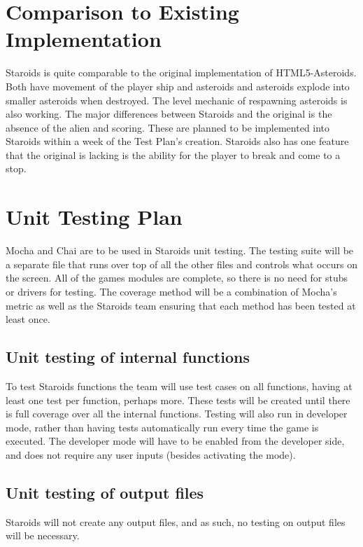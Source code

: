 \documentclass[12pt, titlepage]{article}
\begin{document}
\section{Comparison to Existing Implementation}
Staroids is quite comparable to the original implementation of HTML5-Asteroids. Both have movement of the player ship and asteroids and asteroids explode into smaller asteroids when destroyed. The level mechanic of respawning asteroids is also working. The major differences between Staroids and the original is the absence of the alien and scoring. These are planned to be implemented into Staroids within a week of the Test Plan's creation. Staroids also has one feature that the original is lacking is the ability for the player to break and come to a stop.

\section{Unit Testing Plan}
Mocha and Chai are to be used in Staroids unit testing. The testing suite will be a separate file that runs over top of all the other files and controls what occurs on the screen. All of the games modules are complete, so there is no need for stubs or drivers for testing. The coverage method will be a combination of  Mocha's metric as well as the Staroids team ensuring that each method has been tested at least once.

\subsection{Unit testing of internal functions}
To test Staroids functions the team will use test cases on all functions, having at least one test per function, perhaps more. These tests will be created until there is full coverage over all the internal functions. Testing will also run in developer mode, rather than having tests automatically run every time the game is executed. The developer mode will have to be enabled from the developer side, and does not require any user inputs (besides activating the mode).

\subsection{Unit testing of output files}
Staroids will not create any output files, and as such, no testing on output files will be necessary.


\end{document}
